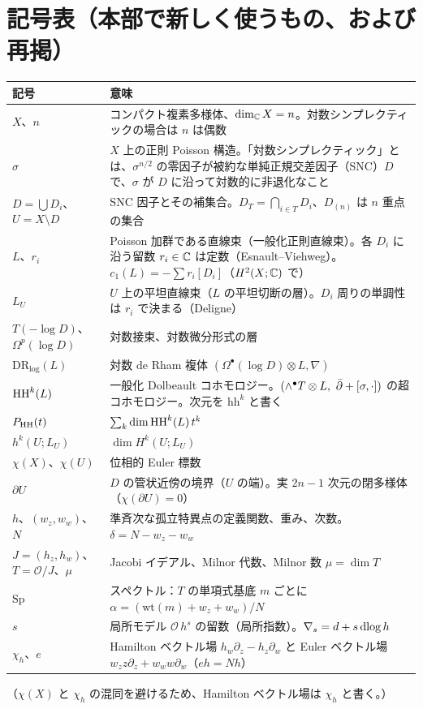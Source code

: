 \section{記号表（本部で新しく使うもの、および再掲）}\label{p5:sec:notation}
\begin{longtable}{>{\raggedright\arraybackslash}p{3.8cm}>{\raggedright\arraybackslash}p{11.2cm}}
\toprule 記号 & 意味\\ \midrule\endhead
$X$、$n$ & コンパクト複素多様体、$\dim_\mathbb C X=n$。対数シンプレクティックの場合は $n$ は偶数\\
$\sigma$ & $X$ 上の正則 Poisson 構造。「対数シンプレクティック」とは、$\sigma^{n/2}$ の零因子が被約な単純正規交差因子（SNC）$D$ で、$\sigma$ が $D$ に沿って対数的に非退化なこと\\
$D=\bigcup D_i$、$U=X\setminus D$ & SNC 因子とその補集合。$D_T=\bigcap_{i\in T}D_i$、$D_{(n)}$ は $n$ 重点の集合\\
$L$、$r_i$ & Poisson 加群である直線束（一般化正則直線束）。各 $D_i$ に沿う留数 $r_i\in\mathbb C$ は定数（Esnault--Viehweg）。$c_1(L)=-\sum r_i[D_i]$（$H^2(X;\mathbb C)$ で）\\
$L_U$ & $U$ 上の平坦直線束（$L$ の平坦切断の層）。$D_i$ 周りの単調性は $r_i$ で決まる（Deligne）\\
$T(-\log D)$、$\Omega^p(\log D)$ & 対数接束、対数微分形式の層\\
$\mathrm{DR}_{\log}(L)$ & 対数 de Rham 複体 $(\Omega^\bullet(\log D)\otimes L,\nabla)$\\
$\mathrm{HH}^k(L)$ & 一般化 Dolbeault コホモロジー。$(\wedge^\bullet T\otimes L,\ \dbar+[\sigma,\cdot])$ の超コホモロジー。次元を $\mathrm{hh}^k$ と書く\\
$P_{\mathrm{HH}}(t)$ & $\sum_k\dim\mathrm{HH}^k(L)\,t^k$\\
$h^k(U;L_U)$ & $\dim H^k(U;L_U)$\\
$\chi(X)$、$\chi(U)$ & 位相的 Euler 標数\\
$\partial U$ & $D$ の管状近傍の境界（$U$ の端）。実 $2n-1$ 次元の閉多様体（$\chi(\partial U)=0$）\\
$h$、$(w_z,w_w)$、$N$ & 準斉次な孤立特異点の定義関数、重み、次数。$\delta=N-w_z-w_w$\\
$J=(h_z,h_w)$、$T=\mathcal O/J$、$\mu$ & Jacobi イデアル、Milnor 代数、Milnor 数 $\mu=\dim T$\\
$\mathrm{Sp}$ & スペクトル：$T$ の単項式基底 $m$ ごとに $\alpha=(\mathrm{wt}(m)+w_z+w_w)/N$\\
$s$ & 局所モデル $\mathcal O\,h^s$ の留数（局所指数）。$\nabla_s=d+s\,\mathrm{dlog}\, h$\\
$\chi_h$、$e$ & Hamilton ベクトル場 $h_w\partial_z-h_z\partial_w$ と Euler ベクトル場 $w_zz\partial_z+w_ww\partial_w$（$e h=Nh$）\\
\bottomrule
\end{longtable}
（$\chi(X)$ と $\chi_h$ の混同を避けるため、Hamilton ベクトル場は $\chi_h$ と書く。）

